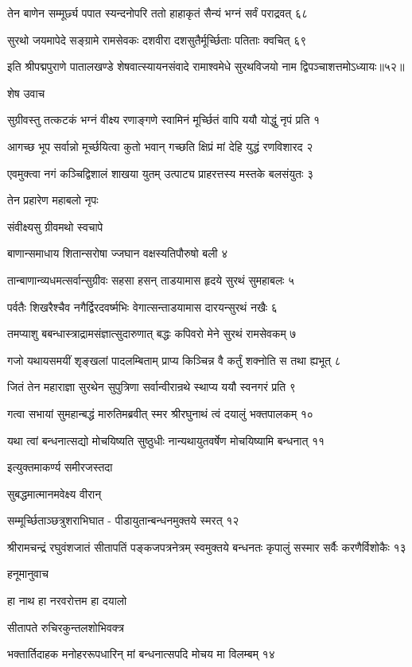 तेन बाणेन सम्मूर्छ्य पपात स्यन्दनोपरि
ततो हाहाकृतं सैन्यं भग्नं सर्वं पराद्रवत् ६८

सुरथो जयमापेदे सङ्ग्रामे रामसेवकः
दशवीरा दशसुतैर्मूर्च्छिताः पतिताः क्वचित् ६९

इति श्रीपद्मपुराणे पातालखण्डे शेषवात्स्यायनसंवादे रामाश्वमेधे सुरथविजयो नाम द्विपञ्चाशत्तमोऽध्यायः॥५२॥


शेष उवाच

सुग्रीवस्तु तत्कटकं भग्नं वीक्ष्य रणाङ्गणे
स्वामिनं मूर्च्छितं वापि ययौ योद्धुं नृपं प्रति १

आगच्छ भूप सर्वान्नो मूर्च्छयित्वा कुतो भवान्
गच्छति क्षिप्रं मां देहि युद्धं रणविशारद २

एवमुक्त्वा नगं कञ्चिद्विशालं शाखया युतम्
उत्पाट्य प्राहरत्तस्य मस्तके बलसंयुतः ३

तेन प्रहारेण महाबलो नृपः

संवीक्ष्यसु ग्रीवमथो स्वचापे

बाणान्समाधाय शितान्सरोषा
ज्जघान वक्षस्यतिपौरुषो बली ४

तान्बाणान्व्यधमत्सर्वान्सुग्रीवः सहसा हसन्
ताडयामास हृदये सुरथं सुमहाबलः ५

पर्वतैः शिखरैश्चैव नगैर्द्विरदवर्ष्मभिः
वेगात्सन्ताडयामास दारयन्सुरथं नखैः ६

तमप्याशु बबन्धास्त्राद्रामसंज्ञात्सुदारुणात्
बद्धः कपिवरो मेने सुरथं रामसेवकम् ७

गजो यथायसमयीं शृङ्खलां पादलम्बिताम्
प्राप्य किञ्चिन्न वै कर्तुं शक्नोति स तथा ह्यभूत् ८

जितं तेन महाराज्ञा सुरथेन सुपुत्रिणा
सर्वान्वीरान्रथे स्थाप्य ययौ स्वनगरं प्रति ९

गत्वा सभायां सुमहान्बद्धं मारुतिमब्रवीत्
स्मर श्रीरघुनाथं त्वं दयालुं भक्तपालकम् १०

यथा त्वां बन्धनात्सद्यो मोचयिष्यति सुष्ठुधीः
नान्यथायुतवर्षेण मोचयिष्यामि बन्धनात् ११

इत्युक्तमाकर्ण्य समीरजस्तदा

सुबद्धमात्मानमवेक्ष्य वीरान्

सम्मूर्च्छिताञ्छत्रुशराभिघात -
पीडायुतान्बन्धनमुक्तये स्मरत् १२

श्रीरामचन्द्रं रघुवंशजातं सीतापतिं पङ्कजपत्रनेत्रम्
स्वमुक्तये बन्धनतः कृपालुं सस्मार सर्वैः करणैर्विशोकैः १३

हनूमानुवाच

हा नाथ हा नरवरोत्तम हा दयालो

सीतापते रुचिरकुन्तलशोभिवक्त्र

भक्तार्तिदाहक मनोहररूपधारिन्
मां बन्धनात्सपदि मोचय मा विलम्बम् १४

